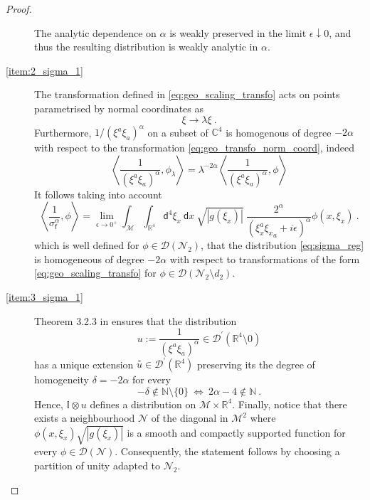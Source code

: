 \documentclass[11pt]{book}
\newcommand{\abs}[1]{\left|#1\right|}
\newcommand{\sm}[1]{\left\langle#1\right\rangle}
\newcommand{\exte}[1]{\overset{\circ}{#1}}
\newcommand{\Dcal}{\mathcal{D}}
\newcommand{\Mcal}{\mathcal{M}}
\newcommand{\Ncal}{\mathcal{N}}
\newcommand{\Ibb}{\mathbb{I}}
\newcommand{\Nbb}{\mathbb{N}}
\newcommand{\Rbb}{\mathbb{R}}
\newcommand{\dsf}{\mathsf{d}}
\newcommand{\fsf}{\mathsf{f}}
\theoremstyle{break}
\begin{document}
\begin{proof}
\begin{description}
The analytic dependence on $\alpha$ is weakly preserved in the limit $\epsilon\downarrow0$, and thus the resulting distribution is weakly analytic in $\alpha$.


\item[\ref{item:2_sigma_1}] The transformation defined in \eqref{eq:geo_scaling_transfo}
acts on points parametrised by normal coordinates as
%
\begin{equation}
\xi \to \lambda \xi \ .
\label{eq:geo_transfo_norm_coord}
\end{equation}
%
Furthermore, $1/(\xi^{a}{\xi}_{a})^\alpha$ on a subset of $\mathbb{C}^4$ is homogenous of degree $-2\alpha$ with respect to the transformation \eqref{eq:geo_transfo_norm_coord}, indeed
%
\begin{equation*}
\sm{\frac{1}{(\xi^{a}{\xi}_{a})^\alpha},\phi_\lambda} = \lambda^{-2\alpha} \sm{\frac{1}{(\xi^{a}{\xi}_{a})^\alpha},\phi}
\end{equation*}
%
It follows taking into account 
%
\begin{equation*}
\sm{ \frac{1}{\sigma^\alpha_\fsf}, \phi } = 
\lim_{\epsilon\to0^+ } \int_\Mcal \int_{\Rbb^4} \dsf^4\xi_x \ \dsf x \ \sqrt{\abs{g(\xi_x)}} \ \frac{2^{\alpha}}{(\xi_x^a{\xi_{x}}_a+i\epsilon)^{\alpha}} \phi(x,\xi_x) \ .
\end{equation*}
which is well defined for $\phi\in\Dcal(\Ncal_2)$, that the distribution \eqref{eq:sigma_reg} is homogeneous of degree $-2\alpha$ with respect to transformations of the form \eqref{eq:geo_scaling_transfo} for $\phi \in \Dcal(\Ncal_2\setminus d_2)$.


\item[\ref{item:3_sigma_1}] Theorem 3.2.3 in \cite{hormander_analysis_1990} ensures that the distribution 
%
\begin{equation*}
u := \frac{1}{(\xi^{a}{\xi}_{a})^\alpha} \in\Dcal^\prime(\Rbb^4\setminus  0) 
\end{equation*}
%
has a unique extension $\exte{u} \in \Dcal^\prime(\Rbb^4)$ preserving its the degree of homogeneity $\delta=-2\alpha$ for every 
%
\begin{equation*}
-\delta\notin\Nbb\setminus\{0\} \ \Leftrightarrow \ 2\alpha-4 \notin \Nbb \ .
\end{equation*}
%
Hence, $\Ibb\otimes u$ defines a distribution on $\Mcal \times \Rbb^4$.
Finally, notice that there exists a neighbourhood $\Ncal$ of the diagonal in $\Mcal^2$
where $\phi(x,\xi_x) \sqrt{\abs{g(\xi_x)}}$ is a smooth and compactly supported function for every $\phi\in \Dcal(\Ncal)$. Consequently, the statement follows by choosing a partition of unity adapted to $\Ncal_2$.
\end{description}
%
\end{proof}
\end{document}
